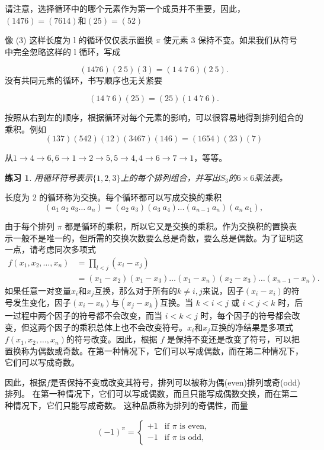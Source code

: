 \documentclass[hyperref,UTF8]{ctexbook}
\newtheorem*{exercise}{练习}
\begin{document}
请注意，选择循环中的哪个元素作为第一个成员并不重要，因此，$( 1476) = ( 7614) $和$( 25) = ( 52) $

像 (3) 这样长度为 l 的循环仅仅表示置换 $\pi$ 使元素 3 保持不变。如果我们从符号中完全忽略这样的 l 循环，写成

$$
(1476)(2\:5)(3)=(1\:4\:7\:6)(2\:5).
$$
没有共同元素的循环，书写顺序也无关紧要

$$
(14\:7\:6)(25)=(25)(1\:4\:7\:6).
$$

按照从右到左的顺序，根据循环对每个元素的影响，可以很容易地得到排列组合的乘积。例如
$$
(137)(542)(12)(3467)(146)=(1654)(23)(7)
$$

从$1\to4\to6,6\to1\to2\to5,5\to4,4\to6\to7\to1$，等等。
\begin{exercise}
     用循环符号表示$\{1,2,3\}$上的每个排列组合，并写出$S_{3}$的$6\times6$乘法表。
\end{exercise}
长度为 2 的循环称为交换。每个循环都可以写成交换的乘积
$$
(a_{1}\:a_{2}\:a_{3}\ldots\:a_{n})=(a_{2}\:a_{3})(a_{3}\:a_{4})\ldots(a_{n-1}\:a_{n})(a_{n}\:a_{1}),
$$

由于每个排列 $\pi$ 都是循环的乘积，所以它又是交换的乘积。作为交换积的置换表示一般不是唯一的，但所需的交换次数要么总是奇数，要么总是偶数。为了证明这一点，请考虑同次多项式
\begin{align*}
    f(x_1,x_2,\dots,x_n)&=\prod_{l<j}(x_i-x_j)\\
    &=(x_1-x_2)(x_1-x_3)\dots(x_1-x_n)(x_2-x_3)\dots(x_{n-1}-x_n).
\end{align*}
如果任意一对变量$x_i$和$x_{j}$互换，那么对于所有的$k\neq i,j$来说，因子$(x_i-x_i)$的符号发生变化，因子$(x_i-x_k)$与$(x_j-x_k)$互换。当 $k<i<j$ 或 $i<j<k$ 时，后一过程中两个因子的符号都不会改变，而当 $i<k<j$ 时，每个因子的符号都会改变，但这两个因子的乘积总体上也不会改变符号。$x_i$和$x_j$互换的净结果是多项式$f(x_1,x_2,\ldots,x_n)$的符号改变。因此，根据 $f$ 是保持不变还是改变了符号，可以把置换称为偶数或奇数。在第一种情况下，它们可以写成偶数，而在第二种情况下，它们可以写成奇数。

因此，根据$f$是否保持不变或改变其符号，排列可以被称为偶(even)排列或奇(odd)排列。 在第一种情况下，它们可以写成偶数，而且只能写成偶数交换，而在第二种情况下，它们只能写成奇数。 这种品质称为排列的奇偶性，而量

$$
(-1)^\pi=\begin{cases}+1&\text{if $\pi$ is even},\\-1&\text{if $\pi$ is odd},\end{cases}
$$
\end{document}

